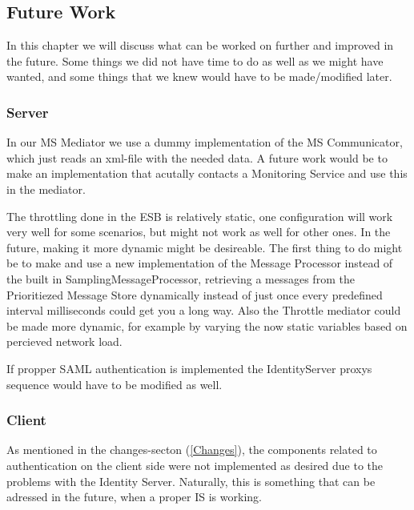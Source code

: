 \subsection{Future Work}\label{Future Work}
    In this chapter we will discuss what can be worked on further and improved in the future. Some things we did not have time to do as well as we might have wanted, and some things that we knew would have to be made/modified later.
    
    \subsubsection{Server}\label{Future:Server}
        In our MS Mediator we use a dummy implementation of the MS Communicator, which just reads an xml-file with the needed data. A future work would be to make an implementation that acutally contacts a Monitoring Service and use this in the mediator.

        The throttling done in the ESB is relatively static, one configuration will work very well for some scenarios, but might not work as well for other ones. In the future, making it more dynamic might be desireable. The first thing to do might be to make and use a new implementation of the Message Processor instead of the built in SamplingMessageProcessor, retrieving a messages from the Prioritiezed Message Store dynamically instead of just once every predefined interval milliseconds could get you a long way. Also the Throttle mediator could be made more dynamic, for example by varying the now static variables based on percieved network load.

        If propper SAML authentication is implemented the IdentityServer proxys sequence would have to be modified as well.

\subsubsection{Client}\label{Future:Client}
As mentioned in the changes-secton (\ref{Changes}), the components related to authentication on the client side were not implemented as desired due to the problems with the Identity Server. Naturally, this is something that can be adressed in the future, when a proper IS is working.

